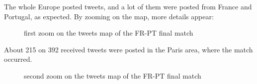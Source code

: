 \documentclass[a4paper,11pt]{report}
\begin{document}
The whole Europe posted tweets, and a lot of them were posted from France and Portugal, as expected. By zooming on the map, more details appear:
\begin{figure}[H]
\vspace{-5pt}
\begin{center}
\vspace{-20pt}
\caption{first zoom on the tweets map of the FR-PT final match}
\end{center}
\end{figure}
\vspace{-10pt}
\newpage

About 215 on 392 received tweets were posted in the Paris area, where the match occurred.
\begin{figure}[H]
\vspace{-5pt}
\begin{center}
\vspace{-20pt}
\caption{second zoom on the tweets map of the FR-PT final match}
\end{center}
\end{figure}
\vspace{-10pt}
\newpage
\end{document}
